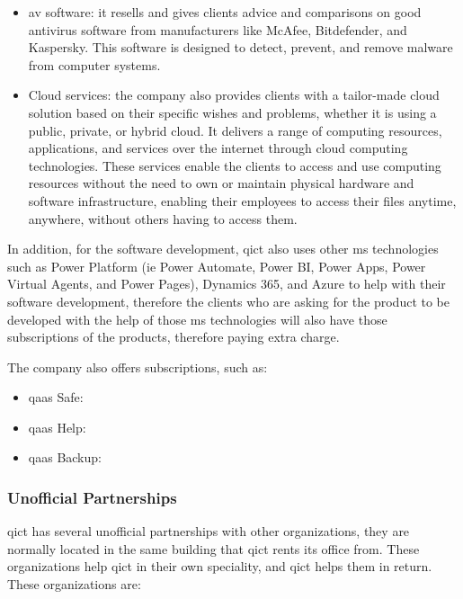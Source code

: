 \begin{multicols}{2}
\begin{itemize}
            \item \acrshort{av} software: it resells and gives clients advice and comparisons on good antivirus software from manufacturers like
                  McAfee, Bitdefender, and Kaspersky. This software is designed to detect, prevent, and remove malware from computer systems.
            \item Cloud services: the company also provides clients with a tailor-made cloud solution based on their specific wishes and
                  problems, whether it is using a public, private, or hybrid cloud. It delivers a range of computing resources, applications,
                  and services over the internet through cloud computing technologies. These services enable the clients to access and use
                  computing resources without the need to own or maintain physical hardware and software infrastructure, enabling their
                  employees to access their files anytime, anywhere, without others having to access them.
      \end{itemize}

      In addition, for the software development, \acrshort{qict} also uses other \acrshort{ms} technologies such as Power Platform
      (\acrshort{ie} Power Automate, Power BI, Power Apps, Power Virtual Agents, and Power Pages), Dynamics 365, and Azure to help with their
      software development, therefore the clients who are asking for the product to be developed with the help of  those \acrshort{ms}
      technologies will also have those subscriptions of the products, therefore paying extra charge.

      The company also offers subscriptions, such as:

      \begin{itemize}
            \item \acrshort{qaas} Safe:
            \item \acrshort{qaas} Help:
            \item \acrshort{qaas} Backup:
      \end{itemize}

      \subsubsection{Unofficial Partnerships}

      \acrshort{qict} has several unofficial partnerships with other organizations, they are normally located in the same building that
      \acrshort{qict} rents its office from. These organizations help \acrshort{qict} in their own speciality, and \acrshort{qict} helps them
      in return. These organizations are:


\end{multicols}
